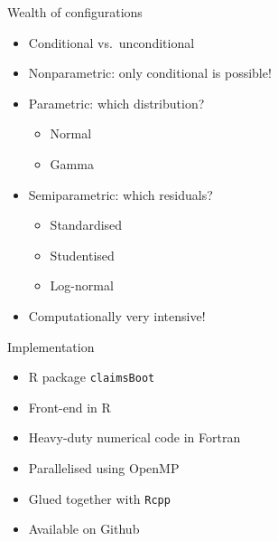 \documentclass[tikz]{beamer}
\begin{document}
\begin{frame}{Wealth of configurations}
  \begin{itemize}
    \item Conditional vs.\ unconditional
    \item Nonparametric: only conditional is possible!
    \item Parametric: which distribution?
          \begin{itemize}
            \item Normal
            \item Gamma
          \end{itemize}
    \item Semiparametric: which residuals?
          \begin{itemize}
            \item Standardised
            \item Studentised
            \item Log-normal
          \end{itemize}
    \item Computationally very intensive!
  \end{itemize}
\end{frame}

\begin{frame}[label=implementation]{Implementation}
  \begin{itemize}
    \item R package \texttt{claimsBoot}
    \item Front-end in R
    \item Heavy-duty numerical code in Fortran
    \item Parallelised using OpenMP
    \item Glued together with \texttt{Rcpp}
    \item Available on Github
  \end{itemize}
\end{frame}
\end{document}
